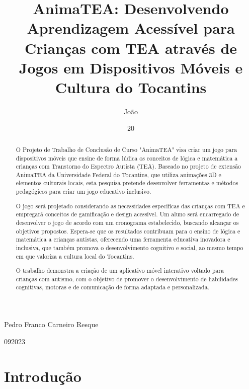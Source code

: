 \documentclass[tcc1,project]{classe_uftex/uftex}
\begin{document}
  \title{AnimaTEA: Desenvolvendo Aprendizagem Acessível para Crianças com TEA através de Jogos em Dispositivos Móveis e Cultura do Tocantins}
  \author{João}{Pedro Franco Carneiro Resque}

  \date{20}{09}{2023}

  

  \maketitle

  \begin{abstract}
  
O Projeto de Trabalho de Conclusão de Curso "AnimaTEA" visa criar um jogo para dispositivos móveis que ensine de forma lúdica os conceitos de lógica e matemática a crianças com Transtorno do Espectro Autista (TEA). Baseado no projeto de extensão AnimaTEA da Universidade Federal do Tocantins, que utiliza animações 3D e elementos culturais locais, esta pesquisa pretende desenvolver ferramentas e métodos pedagógicos para criar um jogo educativo inclusivo. 

O jogo será projetado considerando as necessidades específicas das crianças com TEA e empregará conceitos de gamificação e design acessível. Um aluno será encarregado de desenvolver o jogo de acordo com um cronograma estabelecido, buscando alcançar os objetivos propostos. Espera-se que os resultados contribuam para o ensino de lógica e matemática a crianças autistas, oferecendo uma ferramenta educativa inovadora e inclusiva, que também promova o desenvolvimento cognitivo e social, ao mesmo tempo em que valoriza a cultura local do Tocantins.

O trabalho \cite{DBLP:journals/ijim/EderDMMS16} demonstra a criação de um aplicativo móvel interativo voltado para crianças com autismo, com o objetivo de promover o desenvolvimento de habilidades cognitivas, motoras e de comunicação de forma adaptada e personalizada.

 \end{abstract}


\section*{Introdução}
\end{document}
